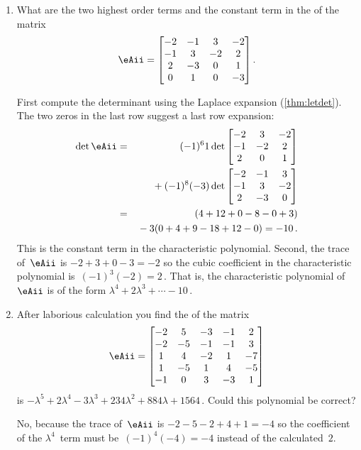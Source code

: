 \begin{example} \label{eg:}
\begin{enumerate}
\item What are the two highest order terms and the constant term in the  of the matrix
\begin{equation*}
\eAii=\begin{bmatrix}-2&-1&3&-2
\\-1&3&-2&2
\\2&-3&0&1
\\0&1&0&-3  \end{bmatrix}.
\end{equation*}
\begin{solution} 
First compute the determinant using the Laplace expansion (\autoref{thm:letdet}).  
The two zeros in the last row suggest a last row expansion:
\begin{eqnarray*}
\det \eAii&=&(-1)^61\det\begin{bmatrix}-2&3&-2
\\-1&-2&2
\\2&0&1 \end{bmatrix}
\\&&{}
+(-1)^8(-3)\det\begin{bmatrix}-2&-1&3
\\-1&3&-2
\\2&-3&0\end{bmatrix}
\\&=&(4+12+0-8-0+3)
\\&&{}-3(0+4+9-18+12-0)
=-10\,.
\end{eqnarray*}
This is the constant term in the characteristic polynomial.
Second, the trace of~\(\eAii\) is \(-2+3+0-3=-2\) so the cubic coefficient in the characteristic polynomial is~\((-1)^3(-2)=2\)\,.
That is, the characteristic polynomial of~\(\eAii\) is of the form \(\lambda^4+2\lambda^3+\cdots-10\)\,.
\end{solution}

\item After laborious calculation you find the  of the matrix
\begin{equation*}
\eAii=\begin{bmatrix}-2&5&-3&-1&2
\\-2&-5&-1&-1&3
\\1&4&-2&1&-7
\\1&-5&1&4&-5
\\-1&0&3&-3&1\end{bmatrix}
\end{equation*}
is \(-\lambda^5+2\lambda^4-3\lambda^3+234\lambda^2+884\lambda+1564\)\,.  
Could this polynomial be correct?
\begin{solution} 
No, because the trace of~\(\eAii\) is \(-2-5-2+4+1=-4\) so the coefficient of the \(\lambda^4\)~term must be~\((-1)^4(-4)=-4\) instead of the calculated~\(2\).
\end{solution}


\end{enumerate}
\end{example}
